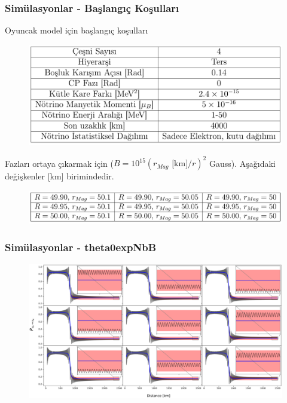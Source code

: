 \documentclass[10pt]{beamer}
\begin{document}
\begin{frame}
    \frametitle{Simülasyonlar - Başlangıç Koşulları}
    Oyuncak model için başlangıç koşulları
    \begin{figure}[hbt!]
        \centering
        \includegraphics[width=.7\textwidth]{fig/baslangicKosullari.png}
    \end{figure}
    Fazları ortaya çıkarmak için ($B= 10^{15} (r_{Mag} \text{ [km]}/r)^{2}$ Gauss). Aşağıdaki değişkenler [km] birimindedir.
    \begin{figure}[hbt!]
        \centering
        \includegraphics[width=\textwidth]{fig/baslangicKosullari9x9.png}
    \end{figure}
\end{frame}

\begin{frame}
    \frametitle{Simülasyonlar - theta0expNbB}
    \begin{figure}[hbt!]
        \centering
        \includegraphics[width=\textwidth]{fig/P_ebeb2dist_initEbEb_10MeV_t3s_theta0.pdf}
    \end{figure}
\end{frame}
\end{document}
